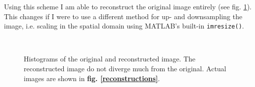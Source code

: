 \documentclass[a4paper, 10pt, final]{article}
\begin{document}
Using this scheme I am able to reconstruct the original image entirely
(see fig. \ref{comparison}).  This changes if I were to use a different
method for up- and downsampling the image, i.e. scaling in the spatial
domain using MATLAB's built-in \texttt{imresize()}.

\begin{figure}[!h]
    \centering
    \hspace{1em}
    \\
    \caption{Histograms of the original and reconstructed image.
    The reconstructed image do not diverge much from the original.
    Actual images are shown in \textbf{fig. \ref{reconstructions}}.}
    \label{comparison}
\end{figure}
\end{document}
